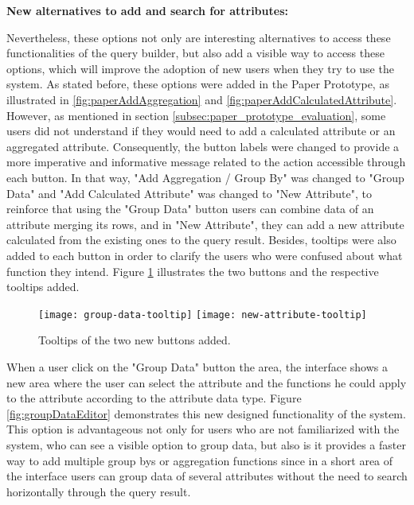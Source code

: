 \medskip

\textbf{New alternatives to add and search for attributes:}

\medskip

Nevertheless, these options not only are interesting alternatives to access these functionalities of the query builder, but also add a visible way to access these options, which will improve the adoption of new users when they try to use the system. As stated before, these options were added in the Paper Prototype, as illustrated in \ref{fig:paperAddAggregation} and \ref{fig:paperAddCalculatedAttribute}. However, as mentioned in section \ref{subsec:paper_prototype_evaluation}, some users did not understand if they would need to add a calculated attribute or an aggregated attribute. Consequently, the button labels were changed to provide a more imperative and informative message related to the action accessible through each button. In that way, "Add Aggregation / Group By" was changed to "Group Data" and "Add Calculated Attribute" was changed to "New Attribute", to reinforce that using the "Group Data" button users can combine data of an attribute merging its rows, and in "New Attribute", they can add a new attribute calculated from the existing ones to the query result. Besides, tooltips were also added to each button in order to clarify the users who were confused about what function they intend. Figure \ref{fig:newButtonsTooltips} illustrates the two buttons and the respective tooltips added.


\begin{figure}[tb]
  \centering
    {\texttt{[image: group-data-tooltip]}}%
    {\texttt{[image: new-attribute-tooltip]}}%
\caption{Tooltips of the two new buttons added.}
  \label{fig:newButtonsTooltips}
\end{figure}

When a user click on the "Group Data" button the area, the interface shows a new area where the user can select the attribute and the functions he could apply to the attribute according to the attribute data type. Figure \ref{fig:groupDataEditor} demonstrates this new designed functionality of the system. This option is advantageous not only for users who are not familiarized with the system, who can see a visible option to group data, but also is it provides a faster way to add multiple group bys or aggregation functions since in a short area of the interface users can group data of several attributes without the need to search horizontally through the query result.

